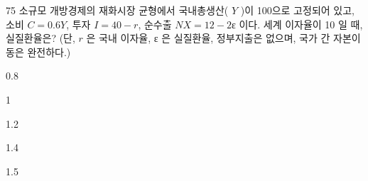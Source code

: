 \begin{question}{75}
소규모 개방경제의 재화시장 균형에서 국내총생산( $Y$ )이 100으로 고정되어 있고, 소비 $C=0.6Y$, 투자 $I=40-r$, 순수출 $NX=12-2$ε 이다. 세계 이자율이 10 일 때, 실질환율은? (단, $r$ 은 국내 이자율, ε 은 실질환율, 정부지출은 없으며, 국가 간 자본이동은 완전하다.)
\begin{choices}
  \item 0.8
  \item 1
  \item 1.2
  \item 1.4
  \item 1.5
\end{choices}
\end{question}
